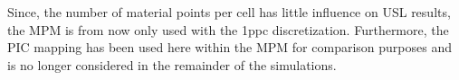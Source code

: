 Since, the number of material points per cell has little influence on USL results, the MPM is from now only used with the 1ppc discretization.
Furthermore, the PIC mapping has been used here within the MPM for comparison purposes and is no longer considered in the remainder of the simulations.
